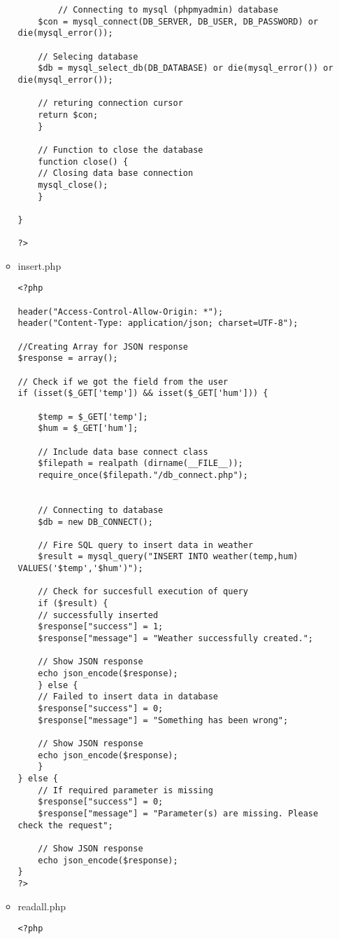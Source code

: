 \documentclass[a4paper,oneside]{article}
\begin{document}
\begin{enumerate}
\begin{itemize}
\begin{verbatim}
		// Connecting to mysql (phpmyadmin) database
	$con = mysql_connect(DB_SERVER, DB_USER, DB_PASSWORD) or die(mysql_error());

	// Selecing database
	$db = mysql_select_db(DB_DATABASE) or die(mysql_error()) or die(mysql_error());

	// returing connection cursor
	return $con;
    }

	// Function to close the database
    function close() {
	// Closing data base connection
	mysql_close();
    }

}

?>
\end{verbatim}
\item insert.php
\label{sec:orgea05907}
\begin{verbatim}
<?php

header("Access-Control-Allow-Origin: *");
header("Content-Type: application/json; charset=UTF-8");

//Creating Array for JSON response
$response = array();

// Check if we got the field from the user
if (isset($_GET['temp']) && isset($_GET['hum'])) {

    $temp = $_GET['temp'];
    $hum = $_GET['hum'];

    // Include data base connect class
    $filepath = realpath (dirname(__FILE__));
	require_once($filepath."/db_connect.php");


    // Connecting to database 
    $db = new DB_CONNECT();

    // Fire SQL query to insert data in weather
    $result = mysql_query("INSERT INTO weather(temp,hum) VALUES('$temp','$hum')");

    // Check for succesfull execution of query
    if ($result) {
	// successfully inserted 
	$response["success"] = 1;
	$response["message"] = "Weather successfully created.";

	// Show JSON response
	echo json_encode($response);
    } else {
	// Failed to insert data in database
	$response["success"] = 0;
	$response["message"] = "Something has been wrong";

	// Show JSON response
	echo json_encode($response);
    }
} else {
    // If required parameter is missing
    $response["success"] = 0;
    $response["message"] = "Parameter(s) are missing. Please check the request";

    // Show JSON response
    echo json_encode($response);
}
?>
\end{verbatim}
\item readall.php
\label{sec:org53d66ab}
\begin{verbatim}
<?php


\end{verbatim}
\end{itemize}
\end{enumerate}
\end{document}
